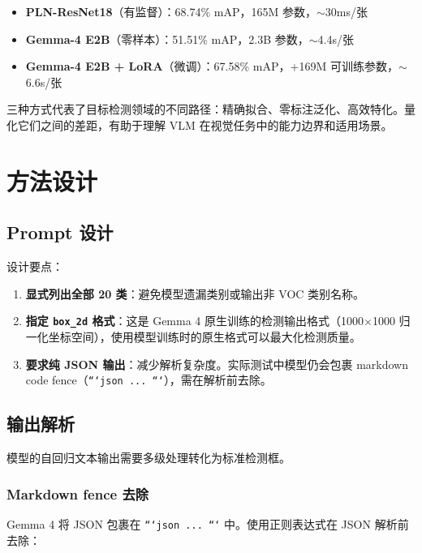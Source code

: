 \documentclass[12pt, a4paper]{article}
\begin{document}
\begin{itemize}
    \item \textbf{PLN-ResNet18}（有监督）：68.74\% mAP，165M 参数，$\sim$30ms/张
    \item \textbf{Gemma-4 E2B}（零样本）：51.51\% mAP，2.3B 参数，$\sim$4.4s/张
    \item \textbf{Gemma-4 E2B + LoRA}（微调）：67.58\% mAP，+169M 可训练参数，$\sim$6.6s/张
\end{itemize}

三种方式代表了目标检测领域的不同路径：精确拟合、零标注泛化、高效特化。量化它们之间的差距，有助于理解 VLM 在视觉任务中的能力边界和适用场景。


\section{方法设计}

\subsection{Prompt 设计}

设计要点：

\begin{enumerate}
    \item \textbf{显式列出全部 20 类}：避免模型遗漏类别或输出非 VOC 类别名称。
    \item \textbf{指定 \texttt{box\_2d} 格式}：这是 Gemma 4 原生训练的检测输出格式（1000$\times$1000 归一化坐标空间），使用模型训练时的原生格式可以最大化检测质量。
    \item \textbf{要求纯 JSON 输出}：减少解析复杂度。实际测试中模型仍会包裹 markdown code fence（\texttt{```json ... ```}），需在解析前去除。
\end{enumerate}

\subsection{输出解析}

模型的自回归文本输出需要多级处理转化为标准检测框。

\subsubsection{Markdown fence 去除}

Gemma 4 将 JSON 包裹在 \texttt{```json ... ```} 中。使用正则表达式在 JSON 解析前去除：
\end{document}
